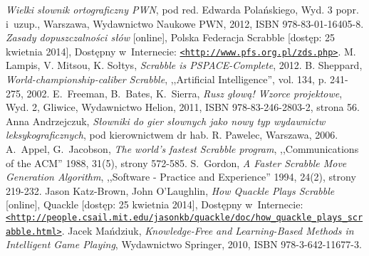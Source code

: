 \documentclass[a4paper,twocolumn,12pt]{article}
\theoremstyle{definition}
\begin{document}
\begin{thebibliography}{9}
	\small
		\emph{Wielki słownik ortograficzny PWN}, pod red. Edwarda Polańskiego, Wyd. 3 popr. i~uzup., Warszawa, Wydawnictwo Naukowe PWN, 2012, ISBN 978-83-01-16405-8.
		\emph{Zasady dopuszczalności słów} [online], Polska Federacja Scrabble [dostęp: 25 kwietnia 2014], Dostępny w~Internecie: \href{http://www.pfs.org.pl/zds.php}{\nolinkurl{<http://www.pfs.org.pl/zds.php>}}.
	 M. Lampis, V. Mitsou, K. Sołtys, \emph{Scrabble is PSPACE-Complete}, 2012.
	 B. Sheppard, \emph{World-championship-caliber Scrabble}, ,,Artificial Intelligence'', vol. 134, p. 241-275, 2002.
	 E.~Freeman, B.~Bates, K.~Sierra, \emph{Rusz głową! Wzorce projektowe}, Wyd. 2, Gliwice, Wydawnictwo Helion, 2011, ISBN 978-83-246-2803-2, strona 56.
		Anna Andrzejczuk, \emph{Słowniki do gier słownych jako nowy typ wydawnictw leksykograficznych}, pod kierownictwem dr hab. R. Pawelec, Warszawa, 2006. 
		A.~Appel, G.~Jacobson, \emph{The world's fastest Scrabble program}, ,,Communications of the ACM'' 1988, 31(5), strony 572-585.
		S.~Gordon, \emph{A Faster Scrabble Move Generation Algorithm}, ,,Software - Practice and Experience'' 1994, 24(2), strony 219-232.
		Jason Katz-Brown, John O'Laughlin, \emph{How Quackle Plays Scrabble} [online], Quackle [dostęp: 25 kwietnia 2014], Dostępny w~Internecie: \href{http://people.csail.mit.edu/jasonkb/quackle/doc/how_quackle_plays_scrabble.html}{\nolinkurl{<http://people.csail.mit.edu/jasonkb/quackle/doc/how\_quackle\_plays\_scrabble.html>}}.
		Jacek Mańdziuk, \emph{Knowledge-Free and Learning-Based Methods in Intelligent Game Playing}, Wydawnictwo Springer, 2010, ISBN 978-3-642-11677-3.
\end{thebibliography}
\end{document}
